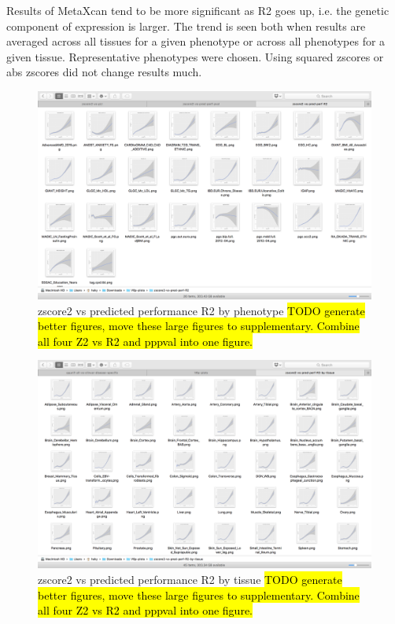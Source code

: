 \documentclass[10pt]{article}
\begin{document}
Results of MetaXcan tend to be more significant as R2 goes up, i.e. the genetic component of expression is larger. The trend is seen both when results are averaged across all tissues for a given phenotype or across all phenotypes for a given tissue. Representative phenotypes were chosen. Using squared zscores or abs zscores did not change results much. 

\begin{figure}
\includegraphics[width=\textwidth]{plots/Fig6a-zscore2-vs-pred-perf-R2-by-phenotype.png}
\caption{zscore2 vs predicted performance R2 by phenotype \hl{TODO generate better figures, move these large figures to supplementary. Combine all four Z2 vs R2 and pppval into one figure.}}
\label{fig:zscore2-R2-pheno}
\end{figure}

\begin{figure}
\includegraphics[width=\textwidth]{plots/Fig6b-zscore2-vs-pred-perf-R2-by-tissue.png}
\caption{zscore2 vs predicted performance R2 by tissue \hl{TODO generate better figures, move these large figures to supplementary. Combine all four Z2 vs R2 and pppval into one figure.}}
\label{fig:zscore2-R2-tissue}
\end{figure}
\end{document}
